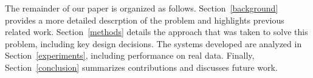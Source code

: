 The remainder of our paper is organized as follows.
Section~\ref{background} provides a more detailed descrption of the problem and highlights previous related work. 
Section~\ref{methods} details the approach that was taken to solve this problem, including key design decisions. 
The systems developed are analyzed in Section~\ref{experiments}, including performance on real data.
Finally, Section~\ref{conclusion} summarizes contributions and discusses future work.
